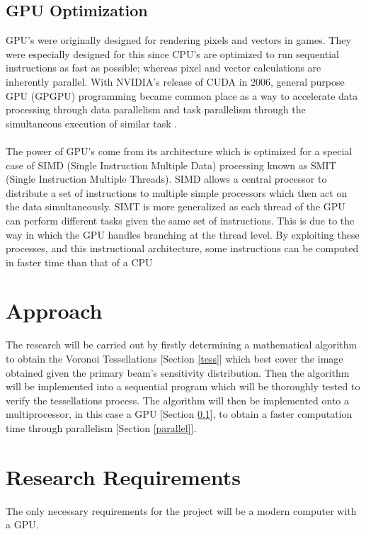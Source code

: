 \subsection{GPU Optimization}\label{gpu}
GPU's were originally designed for rendering pixels and vectors in games. They were especially designed for this since CPU's are optimized to run sequential instructions as fast as possible; whereas pixel and vector calculations are inherently parallel. With NVIDIA's release of CUDA in 2006, general purpose GPU (GPGPU) programming became common place as a way to accelerate data processing through data parallelism and task parallelism through the simultaneous execution of similar task \cite{nvidia_cuda}.
\\
\\
The power of GPU's come from its architecture which is optimized for a special case of SIMD (Single Instruction Multiple Data) processing known as SMIT (Single Instruction Multiple Threads). SIMD allows a central processor to distribute a set of instructions to multiple simple processors which then act on the data simultaneously. SIMT is more generalized as each thread of the GPU can perform different tasks given the same set of instructions. This is due to the way in which the GPU handles branching at the thread level. By exploiting these processes, and this instructional architecture, some instructions can be computed in faster time than that of a CPU \cite{vuduc2013brief}

\section{Approach}
The research will be carried out by firstly determining a mathematical algorithm to obtain the Voronoi Tessellations [Section \ref{tess}] which best cover the image obtained given the primary beam's sensitivity distribution. Then the algorithm will be implemented into a sequential program which will be thoroughly tested to verify the tessellations process. The algorithm will then be implemented onto a multiprocessor, in this case a GPU [Section \ref{gpu}], to obtain a faster computation time through parallelism [Section \ref{parallel}].
\section{Research Requirements}
The only necessary requirements for the project will be a modern computer with a GPU.

